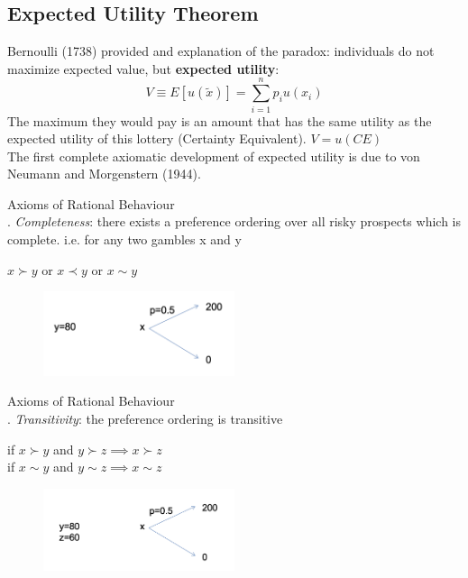 \documentclass[
14pt,notheorems,hyperref={pdfauthor=whatever}
]{beamer}
\begin{document}
\subsection{Expected Utility Theorem}

\begin{frame}
Bernoulli (1738) provided and explanation of the paradox: individuals do not maximize expected value, but \textbf{expected utility}:
\[ V \equiv E[u(\tilde{x})] = \sum_{i=1}^n p_i u(x_i)\]
The maximum they would pay is an amount that has the same utility as the expected utility of this lottery (Certainty Equivalent). $V=u(CE)$\\
The first complete axiomatic development of expected utility is due to von Neumann and Morgenstern (1944).
\end{frame}

\begin{frame}
Axioms of Rational Behaviour\\
\hfill {}. \textit{Completeness}: there exists a preference ordering over all risky prospects which is complete. i.e. for any two gambles x and y\\
\begin{center}
    $x \succ y$ or $x \prec y$ or $x \sim y$
\end{center}
\begin{figure}[ut1]
    \includegraphics[width=0.5\textwidth]{L1UT1}
    \centering
\end{figure}
\end{frame}

\begin{frame}
Axioms of Rational Behaviour\\
\hfill {}. \textit{Transitivity}: the preference ordering is transitive\\
\begin{center}
    if $x \succ y$ and $y \succ z \implies x \succ z$\\
    if $x \sim y$ and $y \sim z \implies x \sim z$
\end{center}
\begin{figure}[ut2]
    \includegraphics[width=0.5\textwidth]{L1UT2}
    \centering
\end{figure}
\end{frame}
\end{document}
